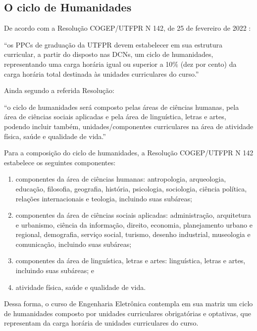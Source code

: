\subsection{O ciclo de Humanidades}
\label{subsec:humanidades}

De acordo com a Resolução COGEP/UTFPR N\textordmasculine{} 142, de 25 de fevereiro de 2022 \cite{cogep142}:

\begin{citacao}
	``os PPCs de graduação da UTFPR devem estabelecer em sua estrutura curricular, a partir do disposto nas DCNs, um ciclo de humanidades, representando uma carga horária igual ou superior a 10$\%$ (dez por cento) da carga horária total destinada às unidades curriculares do curso.''

\end{citacao}

Ainda segundo a referida Resolução: 

\begin{citacao}
	``o ciclo de humanidades será composto pelas áreas de ciências humanas, pela área de ciências sociais aplicadas e pela área de linguística, letras e artes, podendo incluir também, unidades/componentes curriculares na área de atividade física, saúde e qualidade de vida.''
\end{citacao}

Para a composição do ciclo de humanidades, a Resolução COGEP/UTFPR N\textordmasculine{} 142 estabelece os seguintes componentes:

\begin{enumerate}
	\item componentes da área de ciências humanas: antropologia, arqueologia, educação, filosofia, geografia, história, psicologia, sociologia, ciência política, relações internacionais e teologia, incluindo suas subáreas;
	\item componentes da área de ciências sociais aplicadas: administração, arquitetura e urbanismo, ciência da informação, direito, economia, planejamento urbano e regional, demografia, serviço social, turismo, desenho industrial, museologia e comunicação, incluindo suas subáreas;
	\item componentes da área de linguística, letras e artes: linguística, letras e artes, incluindo suas subáreas; e
	\item atividade física, saúde e qualidade de vida.
\end{enumerate}

Dessa forma, o curso de Engenharia Eletrônica contempla em sua matriz um ciclo de humanidades composto por unidades curriculares obrigatórias e optativas, que representam \percentagem{\the\value{horasH}}{\the\value{horasUC}} da carga horária de unidades curriculares do curso. 

